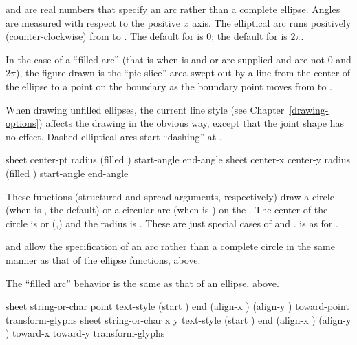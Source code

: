  and  are real numbers that specify an arc
rather than a complete ellipse.  Angles are measured with respect to the
positive $x$ axis.  The elliptical arc runs positively (counter-clockwise) from
 to .  The default for  is $0$;
the default for  is $2\pi$.

In the case of a ``filled arc'' (that is when  is  and
 or  are supplied and are not $0$ and $2\pi$),
the figure drawn is the ``pie slice'' area swept out by a line from the center
of the ellipse to a point on the boundary as the boundary point moves from
 to .

When drawing unfilled ellipses, the current line style (see
Chapter~\ref{drawing-options}) affects the drawing in the obvious way, except
that the joint shape has no effect.  Dashed elliptical arcs start ``dashing'' at
.


  {sheet center-pt radius \key (filled ) start-angle end-angle
                       \DrawingOptions \LineCapOptions}
 {sheet center-x center-y radius \key (filled ) start-angle end-angle
                       \DrawingOptions \LineCapOptions}

These functions (structured and spread arguments, respectively) draw a circle
(when  is , the default) or a circular arc (when
 is ) on the  .  The center of
the circle is  or (,) and the radius
is .  These are just special cases of  and
.   is as for .

 and  allow the specification of an arc rather
than a complete circle in the same manner as that of the ellipse functions,
above.

The ``filled arc'' behavior is the same as that of an ellipse, above.


  {sheet string-or-char point
                     \key text-style (start ) end
                          (align-x ) (align-y )
                          toward-point transform-glyphs
                     \DrawingOptions \TextOptions}
 {sheet string-or-char x y
                     \key text-style (start ) end
                          (align-x ) (align-y )
                          toward-x toward-y transform-glyphs
                     \DrawingOptions \TextOptions}

